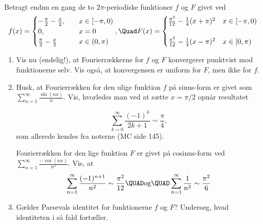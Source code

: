 \begin{opg}\hfill \\
Betragt endnu en gang de to $2 \pi$-periodiske funktioner $f$ og $F$ givet ved
$$ f(x) = \begin{cases}
	        - \frac{\pi}{2} - \frac{x}{2}, &\quad x\in[-\pi,0) \\
	        0, &\quad x=0 \\
	        \frac{\pi}{2} - \frac{x}{2} &\quad x\in(0,\pi)
	    \end{cases} , \Quad
	F(x) = \begin{cases}
	    \frac{\pi^2}{12_{\vphantom 2}}- \frac{1}{4} (x +\pi)^2 & x\in[-\pi,0)\\ 
	    \\
	    \frac{\pi^2}{12}- \frac{1}{4} (x -\pi)^2 & x\in[0,\pi)
	\end{cases} $$
\begin{enumerate}
	\item Vis nu (endelig!), at Fourierrækkerne for $f$ og $F$ konvergerer punktvist mod funktionerne selv. Vis også, at konvergensen er uniform for $F$, men ikke for $f$. 
	
    \item Husk, at Fourierrækken for den ulige funktion $f$ på sinus-form er givet som $\sum_{n=1}^\infty \frac{\sin(n x)}{n}$. Vis, hvorledes man ved at sætte $x=\pi/2$ opnår resultatet 

    $$ \sum_{k=0}^\infty  \frac{(-1)^k}{2k+1} \sim \frac{\pi}{4}, $$
    som allerede kendes fra noterne (MC side 145).

    Fourierrækken for den lige funktion $F$ er givet på cosinus-form ved $\sum_{n=1}^\infty \frac{-\cos(n x)}{n^2}$. Vis, at 
    $$ \sum_{n=1}^\infty  \frac{(-1)^{n+1}}{n^2} \sim \frac{\pi^2}{12} \QUAD\text{og}\QUAD \sum_{n=1}^\infty  \frac{1}{n^2} \sim \frac{\pi^2}{6} $$
	
    \item Gælder Parsevals identitet for funktionerne $f$ og $F$? Undersøg, hvad identiteten i så fald fortæller.
\end{enumerate}
\end{opg}

